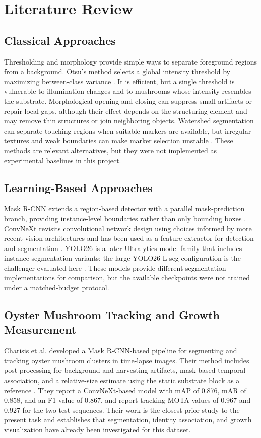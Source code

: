 \documentclass[11pt,a4paper]{article}
\begin{document}
\section{Literature Review}

\subsection{Classical Approaches}

Thresholding and morphology provide simple ways to separate foreground regions from a background. Otsu's method selects a global intensity threshold by maximizing between-class variance \cite{otsu}. It is efficient, but a single threshold is vulnerable to illumination changes and to mushrooms whose intensity resembles the substrate. Morphological opening and closing can suppress small artifacts or repair local gaps, although their effect depends on the structuring element and may remove thin structures or join neighboring objects. Watershed segmentation can separate touching regions when suitable markers are available, but irregular textures and weak boundaries can make marker selection unstable \cite{watershed}. These methods are relevant alternatives, but they were not implemented as experimental baselines in this project.

\subsection{Learning-Based Approaches}

Mask R-CNN extends a region-based detector with a parallel mask-prediction branch, providing instance-level boundaries rather than only bounding boxes \cite{maskrcnn}. ConvNeXt revisits convolutional network design using choices informed by more recent vision architectures and has been used as a feature extractor for detection and segmentation \cite{convnext}. YOLO26 is a later Ultralytics model family that includes instance-segmentation variants; the large YOLO26-L-seg configuration is the challenger evaluated here \cite{yolo26docs}. These models provide different segmentation implementations for comparison, but the available checkpoints were not trained under a matched-budget protocol.

\subsection{Oyster Mushroom Tracking and Growth Measurement}

Charisis et al. developed a Mask R-CNN-based pipeline for segmenting and tracking oyster mushroom clusters in time-lapse images. Their method includes post-processing for background and harvesting artifacts, mask-based temporal association, and a relative-size estimate using the static substrate block as a reference \cite{charisis}. They report a ConvNeXt-based model with mAP of 0.876, mAR of 0.858, and an F1 value of 0.867, and report tracking MOTA values of 0.967 and 0.927 for the two test sequences. Their work is the closest prior study to the present task and establishes that segmentation, identity association, and growth visualization have already been investigated for this dataset.
\end{document}
